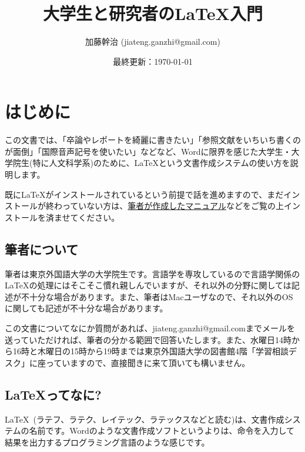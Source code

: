 \documentclass[xelatex,a4paper,base=11pt,twoside,ja=standard]{bxjsarticle}
\title{大学生と研究者の\LaTeX 入門}
\date{最終更新：\today}
\author{加藤幹治 (jiateng.ganzhi@gmail.com)}
\begin{document}


\maketitle
\thispagestyle{empty} %
\newpage %

\tableofcontents
\thispagestyle{empty}
\newpage

%


\newpage

\section{はじめに}
この文書では、「卒論やレポートを綺麗に書きたい」「参照文献をいちいち書くのが面倒」「国際音声記号を使いたい」などなど、Wordに限界を感じた大学生・大学院生(特に人文科学系)のために、\LaTeX という文書作成システムの使い方を説明します。

既に\LaTeX がインストールされているという前提で話を進めますので、まだインストールが終わっていない方は、\href{https://www.dropbox.com/s/xxlthpw4u8d9orp/install_win.pdf?dl=0}{筆者が作成したマニュアル}などをご覧の上インストールを済ませてください。

\subsection{筆者について}
筆者は東京外国語大学の大学院生です。言語学を専攻しているので言語学関係の\LaTeX の処理にはそこそこ慣れ親しんでいますが、それ以外の分野に関しては記述が不十分な場合があります。また、筆者はMacユーザなので、それ以外のOSに関しても記述が不十分な場合があります。

この文書についてなにか質問があれば、jiateng.ganzhi@gmail.comまでメールを送っていただければ、筆者の分かる範囲で回答いたします。また、水曜日14時から16時と木曜日の15時から19時までは東京外国語大学の図書館4階「学習相談デスク」に座っていますので、直接聞きに来て頂いても構いません。

\subsection{\LaTeX ってなに?}
\LaTeX~(ラテフ、ラテク、レイテック、ラテックスなどと読む)は、文書作成システムの名前です。Wordのような文書作成ソフトというよりは、命令を入力して結果を出力するプログラミング言語のような感じです。
\end{document}
